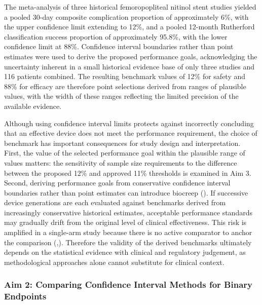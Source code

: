 \documentclass{article}
\begin{document}
The meta-analysis of three historical femoropopliteal nitinol stent
studies yielded a pooled 30-day composite complication proportion of
approximately 6\%, with the upper confidence limit extending to 12\%,
and a pooled 12-month Rutherford classification success proportion of
approximately 95.8\%, with the lower confidence limit at 88\%.
Confidence interval boundaries rather than point estimates were used to
derive the proposed performance goals, acknowledging the uncertainty
inherent in a small historical evidence base of only three studies and
116 patients combined. The resulting benchmark values of 12\% for safety
and 88\% for efficacy are therefore point selections derived from ranges
of plausible values, with the width of these ranges reflecting the
limited precision of the available evidence.

Although using confidence interval limits protects against incorrectly
concluding that an effective device does not meet the performance
requirement, the choice of benchmark has important consequences for
study design and interpretation. First, the value of the selected
performance goal within the plausible range of values matters: the
sensitivity of sample size requirements to the difference between the
proposed 12\% and approved 11\% thresholds is examined in Aim 3. Second,
deriving performance goals from conservative confidence interval
boundaries rather than point estimates can introduce biocreep
(). If successive device
generations are each evaluated against benchmarks derived from
increasingly conservative historical estimates, acceptable performance
standards may gradually drift from the original level of clinical
effectiveness. This risk is amplified in a single-arm study because
there is no active comparator to anchor the comparison
(,).
Therefore the validity of the derived benchmarks ultimately depends on
the statistical evidence with clinical and regulatory judgement, as
methodological approaches alone cannot substitute for clinical context.

\subsubsection{Aim 2: Comparing Confidence Interval Methods for Binary
Endpoints}\label{aim-2-comparing-confidence-interval-methods-for-binary-endpoints}
\end{document}

